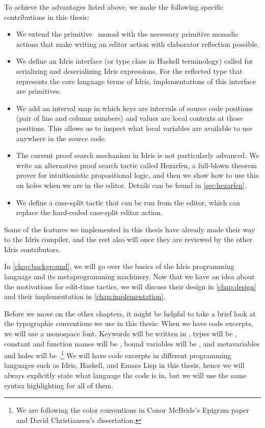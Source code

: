 To achieve the advantages listed above, we make the following specific
contributions in this thesis:
\begin{itemize}
\item We extend the primitive \Elab\ monad with the necessary primitive monadic
actions that make writing an editor action with elaborator reflection possible.
\item We define an Idris interface (or type class in Haskell terminology)
called  for serializing and deserializing Idris expressions.
For the reflected type that represents the core language terms of Idris,
implementations of this interface are primitives.
\item We add an interval map in which keys are intervals of source code
positions (pair of line and column numbers) and values are local contexts at
those positions. This allows us to inspect what local variables are available to
use anywhere in the source code.
\item The current proof search mechanism in Idris is not particularly advanced.
We write an alternative proof search tactic called Hezarfen, a full-blown
theorem prover for intuitionistic propositional logic, and then we show how
to use this on holes when we are in the editor.
Details can be found in \autoref{sec:hezarfen}.
\item We define a case-split tactic that can be run from the editor, which can
replace the hard-coded case-split editor action.
\end{itemize}

Some of the features we implemented in this thesis have already made their way to
the Idris compiler, and the rest also will once they are reviewed by the
other Idris contributors.

In \autoref{chap:background}, we will go over the basics of the Idris
programming language and its metaprogramming machinery.
Now that we have an idea about the motivations for edit-time tactics,
we will discuss their design in \autoref{chap:design} and their implementation
in \autoref{chap:implementation}.

Before we move on the other chapters, it might be helpful to take a brief look
at the typographic conventions we use in this thesis: When we have code
excerpts, we will use a monospace font.  Keywords will be written in , types will be , constant and function names will be
, bound variables will be , and metavariables and holes
will be \texttt{}.\footnote{We are following the color
conventions in Conor McBride's Epigram paper\cite{epigram} and David
Christiansen's dissertation\cite{davidphd}.} We will have code excerpts in
different programming languages such as Idris, Haskell, and Emacs Lisp in this
thesis, hence we will always explicitly state what language the code is in, but
we will use the same syntax highlighting for all of them.


